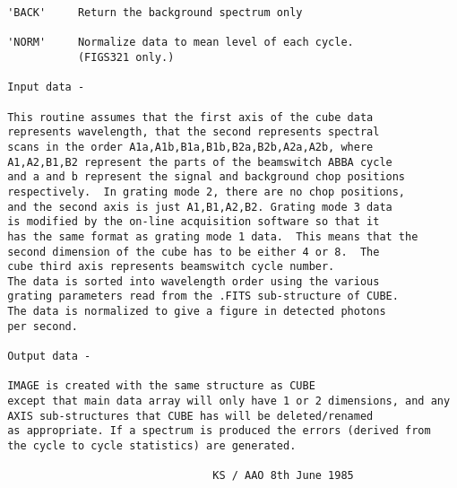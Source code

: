 \begin{description}
\begin{verbatim}
 'BACK'     Return the background spectrum only

 'NORM'     Normalize data to mean level of each cycle.
            (FIGS321 only.)

 Input data -

 This routine assumes that the first axis of the cube data
 represents wavelength, that the second represents spectral
 scans in the order A1a,A1b,B1a,B1b,B2a,B2b,A2a,A2b, where
 A1,A2,B1,B2 represent the parts of the beamswitch ABBA cycle
 and a and b represent the signal and background chop positions
 respectively.  In grating mode 2, there are no chop positions,
 and the second axis is just A1,B1,A2,B2. Grating mode 3 data
 is modified by the on-line acquisition software so that it
 has the same format as grating mode 1 data.  This means that the
 second dimension of the cube has to be either 4 or 8.  The
 cube third axis represents beamswitch cycle number.
 The data is sorted into wavelength order using the various
 grating parameters read from the .FITS sub-structure of CUBE.
 The data is normalized to give a figure in detected photons
 per second.

 Output data -

 IMAGE is created with the same structure as CUBE
 except that main data array will only have 1 or 2 dimensions, and any
 AXIS sub-structures that CUBE has will be deleted/renamed
 as appropriate. If a spectrum is produced the errors (derived from
 the cycle to cycle statistics) are generated.

                                 KS / AAO 8th June 1985
\end{verbatim}
\end{description}
